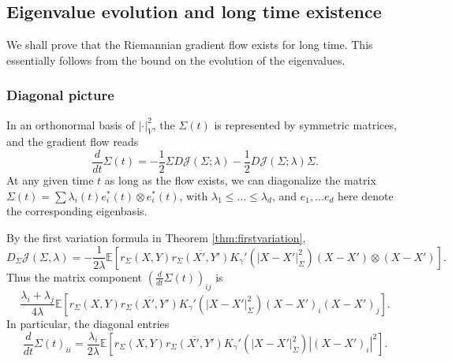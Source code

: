 \documentclass[a4paper]{article}
\theoremstyle{definition}
\newcommand{\E}{\mathbb{E}}
\newcommand{\1}{\mathbbm{1}}
\begin{document}
	
	
	
	
	
	
	
	
	
	
	\subsection{Eigenvalue evolution and long time existence}\label{sect:longtimeexistence}
	
	
	
	
	We shall prove that the Riemannian gradient flow exists for long time. This essentially follows  from the bound on the evolution of the eigenvalues.
	
	
	
	
	\subsubsection{Diagonal picture}\label{sect:Diagonalpicture}
	
	
	
	
	In an orthonormal basis of $|\cdot|_V^2$, the $\Sigma(t)$ is represented by symmetric matrices, and the gradient flow reads
	\[
	\frac{d}{dt}\Sigma(t)=-\frac{1}{2}\Sigma D\mathcal{J}(\Sigma;\lambda)- \frac{1}{2}D\mathcal{J}(\Sigma;\lambda) \Sigma.
	\]
	At any given time $t$ as long as the flow exists, we can diagonalize the matrix $\Sigma(t)=\sum \lambda_i(t) e_i^*(t)\otimes e_i^*(t)$, with $\lambda_1\leq \ldots\leq \lambda_d$, and $e_1,\ldots e_d$ here denote the corresponding eigenbasis.
	
	
	
	
	
	By the first variation formula in Theorem \ref{thm:firstvariation},
	\[
	D_\Sigma \mathcal{J}(\Sigma, \lambda)=  - \frac{1}{2\lambda}   \E[  r_\Sigma(X,Y) \overline{ r_\Sigma(X',Y') }    K_{\gamma}'( |X-X'|_\Sigma^2) (X-X')\otimes (X-X')].
	\]
	Thus the matrix component $(\frac{d}{dt}\Sigma(t))_{ij}$ is
	\[
	\frac{\lambda_i+\lambda_j}{4\lambda}   \E[  r_\Sigma(X,Y) \overline{  r_\Sigma(X',Y') }    K_{\gamma}'( |X-X'|_\Sigma^2) (X-X')_i(X-X')_j].
	\]
	In particular, the diagonal entries 
	\[
	\frac{d}{dt}\Sigma(t)_{ii} = \frac{\lambda_i}{2\lambda}   \E[  r_\Sigma(X,Y)  \overline{r_\Sigma(X',Y')  }   K_{\gamma}'( |X-X'|_\Sigma^2) |(X-X')_i|^2].
	\]
	
	
	
	
	
	
	
\end{document}
